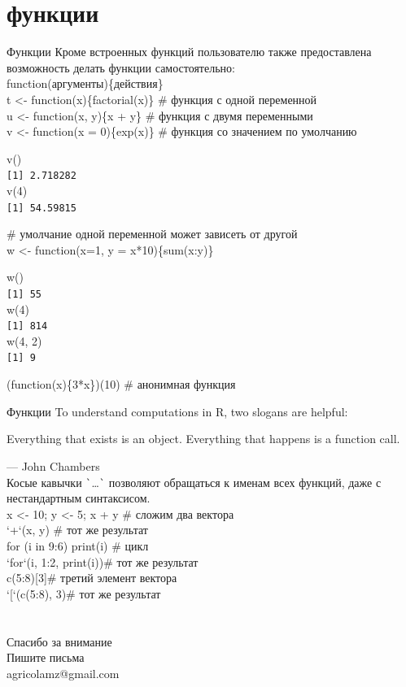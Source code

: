 \section{функции}
\begin{frame}{Функции}
Кроме встроенных функций пользователю также предоставлена возможность делать функции самостоятельно:\\
function(аргументы)\{действия\}\\
t <- function(x)\{factorial(x)\} \hfill \# функция с одной переменной\\
u <- function(x, y)\{x + y\} \hfill \# функция с двумя переменными\\
v <- function(x = 0)\{exp(x)\} \hfill \# функция со значением по умолчанию\\
\begin{multicols}{2}
v()\\
\footnotesize\verb"[1] 2.718282"\normalsize\\
v(4)\\
\footnotesize\verb"[1] 54.59815"\normalsize
\end{multicols}
\# умолчание одной переменной может зависеть от другой\\
w <- function(x=1, y = x*10)\{sum(x:y)\}\\
\begin{multicols}{3}
w()\\
\footnotesize\verb"[1] 55"\normalsize\\
w(4)\\
\footnotesize\verb"[1] 814"\normalsize\\
w(4, 2)\\
\footnotesize\verb"[1] 9"\normalsize\\
\end{multicols}
(function(x)\{3*x\})(10) \hfill \# анонимная функция
\end{frame}
\begin{frame}{Функции}
To understand computations in R, two slogans are helpful:
\begin{itemize}
\mytem Everything that exists is an object.
\mytem Everything that happens is a function call.
\end{itemize} 
\hfill — John Chambers\\ \vfill
Косые кавычки \verb"`"\dots\verb"`" позволяют обращаться к именам всех функций, даже с нестандартным синтаксисом.\\
x <- 10; y <- 5; x + y \hfill \# сложим два вектора\\
`+`(x, y) \hfill \# тот же результат\bigskip \\
for (i in 9:6) print(i) \hfill \# цикл\\
`for`(i, 1:2, print(i))\hfill \# тот же результат\bigskip \\
c(5:8)[3]\hfill \# третий элемент вектора\\
`[`(c(5:8), 3)\hfill \# тот же результат
\end{frame}
\section{}
\begin{frame}
{\huge Спасибо за внимание\bigskip\\
\normalsize Пишите письма\\
agricolamz@gmail.com
\vspace{-130pt}}
\end{frame}
